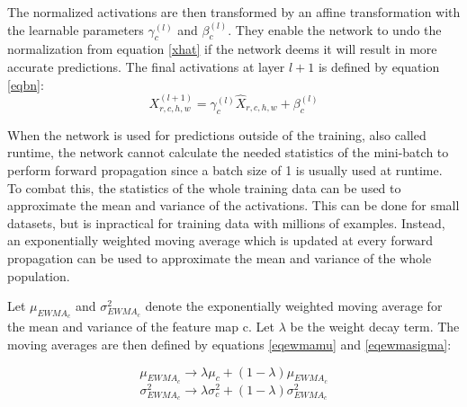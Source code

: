 \documentclass[a4paper,11pt,twoside]{article}
\begin{document}
The normalized activations are then transformed by an affine transformation with the learnable parameters $\gamma_{c}^{(l)}$ and $\beta_{c}^{(l)}$. They enable the network to undo the normalization from equation \eqref{xhat} if the network deems it will result in more accurate predictions. The final activations at layer $l+1$ is defined by equation \eqref{eqbn}: \cite{cs231n} \cite{batchnorm}
\begin{equation}\label{eqbn}
X^{(l+1)}_{r,c,h,w} = \gamma_{c}^{(l)} \hat{X}_{r,c,h,w} + \beta_{c}^{(l)}
\end{equation}

When the network is used for predictions outside of the training, also called runtime, the network cannot calculate the needed statistics of the mini-batch to perform forward propagation since a batch size of 1 is usually used at runtime. To combat this, the statistics of the whole training data can be used to approximate the mean and variance of the activations. This can be done for small datasets, but is inpractical for training data with millions of examples. Instead, an exponentially weighted moving average which is updated at every forward propagation can be used to approximate the mean and variance of the whole population. \cite{cs231n} \cite{batchnorm}

Let $\mu_{EWMA_c}$ and $\sigma^2_{EWMA_c}$ denote the exponentially weighted moving average for the mean and variance of the feature map c. Let $\lambda$ be the weight decay term. The moving averages are then defined by equations \eqref{eqewmamu} and \eqref{eqewmasigma}:

\begin{equation}\label{eqewmamu}
\mu_{EWMA_c} \to \lambda \mu_c + (1-\lambda)\mu_{EWMA_c}
\end{equation}
\begin{equation}\label{eqewmasigma}
\sigma^2_{EWMA_c} \to \lambda \sigma^2_c + (1-\lambda)\sigma^2_{EWMA_c}
\end{equation}
\end{document}
